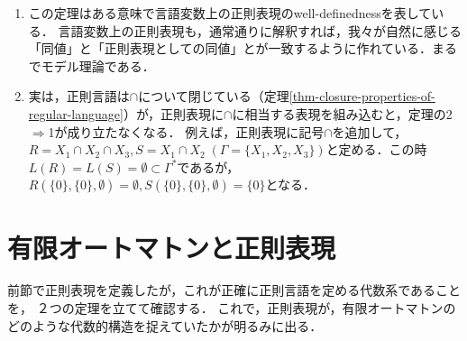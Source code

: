 \begin{remark}\label{remark-regular-expressions-on-language-variables}\mbox{}
    \begin{enumerate}
        \item この定理はある意味で言語変数上の正則表現のwell-definednessを表している．
        言語変数上の正則表現も，通常通りに解釈すれば，我々が自然に感じる「同値」と「正則表現としての同値」とが一致するように作れている．まるでモデル理論である．
        \item 実は，正則言語は$\cap$について閉じている（定理\ref{thm-closure-properties-of-regular-language}）が，正則表現に$\cap$に相当する表現を組み込むと，定理の2$\Rightarrow$1が成り立たなくなる．
        例えば，正則表現に記号$\cap$を追加して，$R=X_1\cap X_2\cap X_3,S=X_1\cap X_2\;(\Gamma=\{X_1,X_2,X_3\})$と定める．この時$L(R)=L(S)=\emptyset\subset\Gamma^*$であるが，$R(\{0\},\{0\},\emptyset)=\emptyset,S(\{0\},\{0\},\emptyset)=\{0\}$となる．
    \end{enumerate}
\end{remark}

\section{有限オートマトンと正則表現}

\begin{tcolorbox}[colframe=ForestGreen, colback=ForestGreen!10!white, breakable]
    前節で正則表現を定義したが，これが正確に正則言語を定める代数系であることを，
    ２つの定理を立てて確認する．
    これで，正則表現が，有限オートマトンのどのような代数的構造を捉えていたかが明るみに出る．
\end{tcolorbox}

